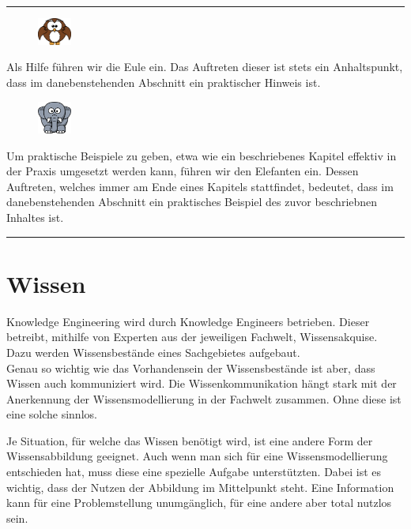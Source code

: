 \noindent\rule[1ex]{\textwidth}{1pt}
\begin{figure}
    \vspace{-12pt}
    \includegraphics[width=0.1\textwidth]{bilder/owl.png}
\end{figure}
Als Hilfe führen wir die Eule ein. Das Auftreten dieser ist stets ein Anhaltspunkt, dass im danebenstehenden Abschnitt ein praktischer Hinweis ist.

\vspace{30pt}

\begin{figure}
    \vspace{-12pt}
    \includegraphics[width=0.1\textwidth]{bilder/elephant.png}
\end{figure}
Um praktische Beispiele zu geben, etwa wie ein beschriebenes Kapitel effektiv in der Praxis umgesetzt werden kann, führen wir den Elefanten ein.
Dessen Auftreten, welches immer am Ende eines Kapitels stattfindet, bedeutet, dass im danebenstehenden Abschnitt ein praktisches Beispiel des zuvor beschriebnen Inhaltes ist.

\noindent\rule[1ex]{\textwidth}{1pt}

\newpage

\section{Wissen}
\label{chap:einleitung_wissen}


Knowledge Engineering wird durch Knowledge Engineers betrieben. Dieser betreibt, mithilfe von Experten aus der jeweiligen Fachwelt, Wissensakquise. Dazu werden Wissensbestände eines Sachgebietes aufgebaut. \\
Genau so wichtig wie das Vorhandensein der Wissensbestände ist aber, dass Wissen auch kommuniziert wird. Die Wissenkommunikation hängt stark mit der Anerkennung der Wissensmodellierung in der Fachwelt zusammen. Ohne diese ist eine solche sinnlos.

Je Situation, für welche das Wissen benötigt wird, ist eine andere Form der Wissensabbildung geeignet. Auch wenn man sich für eine Wissensmodellierung entschieden hat, muss diese eine spezielle Aufgabe unterstützten. Dabei ist es wichtig, dass der Nutzen der Abbildung im Mittelpunkt steht. Eine Information kann für eine Problemstellung unumgänglich, für eine andere aber total nutzlos sein.

